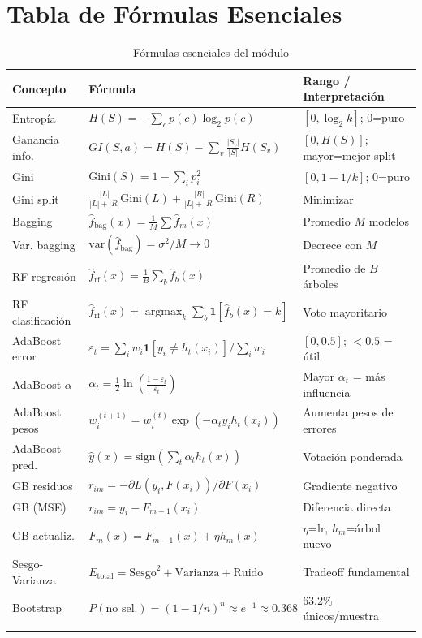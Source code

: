 \documentclass[11pt, a4paper]{book}
\begin{document}
\section{Tabla de Fórmulas Esenciales}

\begin{longtable}{lll}
  \toprule
  \textbf{Concepto} & \textbf{Fórmula} & \textbf{Rango / Interpretación}\\
  \midrule
  \endhead
  Entropía & $H(S) = -\sum_c p(c)\log_2 p(c)$ & $[0, \log_2 k]$; 0=puro\\
  Ganancia info. & $GI(S,a) = H(S) - \sum_v \frac{|S_v|}{|S|}H(S_v)$ & $[0, H(S)]$; mayor=mejor split\\
  Gini & $\text{Gini}(S) = 1-\sum_i p_i^2$ & $[0, 1-1/k]$; 0=puro\\
  Gini split & $\frac{|L|}{|L|+|R|}\text{Gini}(L)+\frac{|R|}{|L|+|R|}\text{Gini}(R)$ & Minimizar\\
  Bagging & $\hat{f}_\text{bag}(x) = \frac{1}{M}\sum \hat{f}_m(x)$ & Promedio $M$ modelos\\
  Var. bagging & $\text{var}(\hat{f}_\text{bag}) = \sigma^2/M \to 0$ & Decrece con $M$\\
  RF regresión & $\hat{f}_\text{rf}(x) = \frac{1}{B}\sum_b \hat{f}_b(x)$ & Promedio de $B$ árboles\\
  RF clasificación & $\hat{f}_\text{rf}(x) = \operatorname{argmax}_k\sum_b \mathbf{1}[\hat{f}_b(x)=k]$ & Voto mayoritario\\
  AdaBoost error & $\varepsilon_t = \sum_i w_i \mathbf{1}[y_i\neq h_t(x_i)] / \sum_i w_i$ & $[0, 0.5]$; $<0.5$ = útil\\
  AdaBoost $\alpha$ & $\alpha_t = \frac{1}{2}\ln\!\left(\frac{1-\varepsilon_t}{\varepsilon_t}\right)$ & Mayor $\alpha_t$ = más influencia\\
  AdaBoost pesos & $w_i^{(t+1)} = w_i^{(t)}\exp(-\alpha_t y_i h_t(x_i))$ & Aumenta pesos de errores\\
  AdaBoost pred. & $\hat{y}(x) = \text{sign}(\sum_t \alpha_t h_t(x))$ & Votación ponderada\\
  GB residuos & $r_{im} = -\partial L(y_i,F(x_i))/\partial F(x_i)$ & Gradiente negativo\\
  GB (MSE) & $r_{im} = y_i - F_{m-1}(x_i)$ & Diferencia directa\\
  GB actualiz. & $F_m(x) = F_{m-1}(x) + \eta h_m(x)$ & $\eta$=lr, $h_m$=árbol nuevo\\
  Sesgo-Varianza & $E_\text{total} = \text{Sesgo}^2 + \text{Varianza} + \text{Ruido}$ & Tradeoff fundamental\\
  Bootstrap & $P(\text{no sel.}) = (1-1/n)^n \approx e^{-1} \approx 0.368$ & 63.2\% únicos/muestra\\
  \bottomrule
  \caption{Fórmulas esenciales del módulo}
\end{longtable}
\end{document}
